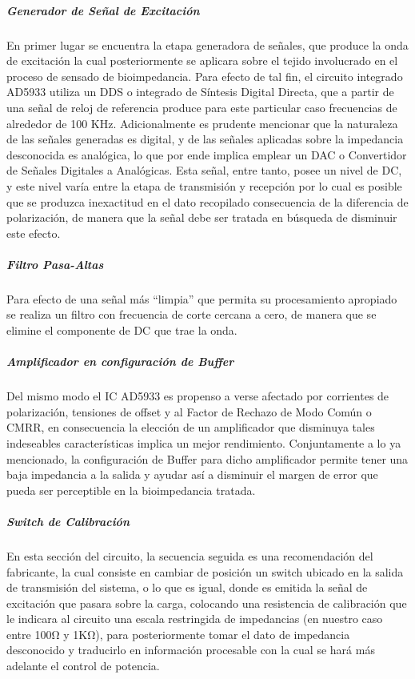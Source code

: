 \documentclass[12pt,letterpaper,spanish]{article}
\begin{document}
					\subparagraph{Generador de Señal de Excitación}
					\hfill\break
En primer lugar se encuentra la etapa generadora de señales, que produce la onda de excitación la cual posteriormente se aplicara sobre el tejido involucrado en el proceso de sensado de bioimpedancia. Para efecto de tal fin, el circuito integrado AD5933 utiliza un DDS o integrado de Síntesis Digital Directa, que a partir de una señal de reloj de referencia produce para este particular caso frecuencias de alrededor de 100 KHz. Adicionalmente es prudente mencionar que la naturaleza de las señales generadas es digital, y de las señales aplicadas sobre la impedancia desconocida es analógica, lo que por ende  implica emplear un DAC o Convertidor de Señales Digitales a Analógicas.
Esta señal, entre tanto, posee un nivel de DC, y este nivel varía entre la etapa de transmisión y recepción   por lo cual es posible que se produzca inexactitud en el dato recopilado consecuencia de la diferencia de polarización, de manera que la señal debe ser tratada en búsqueda de disminuir este efecto. 

					\subparagraph{Filtro Pasa-Altas}
					\hfill\break
Para efecto de una señal más “limpia” que permita su procesamiento apropiado se  realiza un filtro con frecuencia de corte cercana a cero, de manera que se elimine el componente de DC que trae la onda.											

					\subparagraph{Amplificador en configuración de Buffer}
					\hfill\break
Del mismo modo el IC AD5933 es propenso a verse afectado por corrientes de polarización, tensiones de offset y al Factor de Rechazo de Modo Común o CMRR, en consecuencia  la elección de un amplificador que disminuya tales indeseables características implica un mejor rendimiento. Conjuntamente a lo ya mencionado, la configuración de Buffer para dicho amplificador permite tener una baja impedancia a la salida y ayudar así a disminuir el margen de error que pueda ser perceptible en la bioimpedancia tratada.				

					\subparagraph{Switch de Calibración}
					\hfill\break
En esta sección del circuito, la secuencia seguida es una recomendación del fabricante, la cual consiste en cambiar de posición un switch ubicado en la salida de transmisión del sistema, o lo que es igual, donde es emitida la señal de excitación que pasara sobre la carga, colocando una resistencia de calibración que le indicara al circuito una escala restringida de impedancias (en nuestro caso entre 100Ω y 1KΩ), para posteriormente tomar el dato de impedancia desconocido y traducirlo en información procesable con la cual se hará más adelante el control de potencia.				
				
\end{document}
